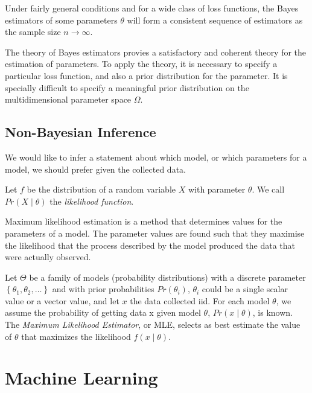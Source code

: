 {Under fairly general conditions and for a wide class of loss functions, the Bayes estimators of some parameters $\theta$ will form a consistent sequence of estimators as the sample size $n \rightarrow \infty$.

The theory of Bayes estimators provies a satisfactory and coherent theory for the estimation of parameters. To apply the theory, it is necessary to specify a particular loss function, and also a prior distribution for the parameter. It is specially difficult to specify a meaningful prior distribution on the multidimensional parameter space $\Omega$.

}


\subsection{Non-Bayesian Inference}

We would like to infer a statement about which model, or which parameters for a model, we should prefer given the collected data.

\begin{definition}
    Let $f$ be the distribution of a random variable $X$ with parameter $\theta$. We call $Pr(X \mid \theta)$ the \emph{likelihood function}.
\end{definition}

{\color{red} Maximum likelihood estimation is a method that determines values for the parameters of a model. The parameter values are found such that they maximise the likelihood that the process described by the model produced the data that were actually observed.}

Let $\Theta$ be a family of models (probability distributions) with a discrete parameter $\left\{ \theta_1,\theta_2,\ldots \right\}$ and with prior probabilities $Pr\left(\theta_i \right)$, $\theta_i$ could be a single scalar value or a vector value, and let $x$ the data collected {\color{red} iid}. For each model $\theta$, we assume the probability of getting data x given model $\theta$, $Pr\left(x\mid\theta\right)$, is known. The \emph{Maximum Likelihood Estimator}, or MLE, selects as best estimate the value of $\theta$ that maximizes the likelihood $f\left(x\mid\theta\right)$.





%
%

\section{Machine Learning}
\label{sec:machine_learning}

